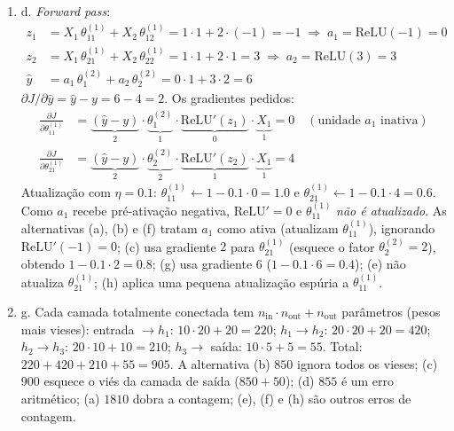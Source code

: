 \documentclass{dlproblemset}
\begin{document}
\begin{enumerate}[1)]
    \item d. \textit{Forward pass}:
    \begin{align*}
        z_1 &= X_1\,\theta^{(1)}_{11} + X_2\,\theta^{(1)}_{12} = 1\cdot 1 + 2\cdot(-1) = -1 \;\Rightarrow\; a_1 = \mathrm{ReLU}(-1) = 0 \\
        z_2 &= X_1\,\theta^{(1)}_{21} + X_2\,\theta^{(1)}_{22} = 1\cdot 1 + 2\cdot 1 = 3 \;\Rightarrow\; a_2 = \mathrm{ReLU}(3) = 3 \\
        \hat{y} &= a_1\,\theta^{(2)}_{1} + a_2\,\theta^{(2)}_{2} = 0\cdot 1 + 3\cdot 2 = 6
    \end{align*}
    $\partial J/\partial \hat{y} = \hat{y} - y = 6 - 4 = 2$. Os gradientes pedidos:
    \begin{align*}
        \frac{\partial J}{\partial \theta^{(1)}_{11}} &= \underbrace{(\hat{y}-y)}_{2}\cdot \underbrace{\theta^{(2)}_{1}}_{1}\cdot \underbrace{\mathrm{ReLU}'(z_1)}_{0}\cdot \underbrace{X_1}_{1} = 0 \quad (\text{unidade } a_1 \text{ inativa}) \\
        \frac{\partial J}{\partial \theta^{(1)}_{21}} &= \underbrace{(\hat{y}-y)}_{2}\cdot \underbrace{\theta^{(2)}_{2}}_{2}\cdot \underbrace{\mathrm{ReLU}'(z_2)}_{1}\cdot \underbrace{X_1}_{1} = 4
    \end{align*}
    Atualização com $\eta = 0.1$: $\theta^{(1)}_{11} \leftarrow 1 - 0.1\cdot 0 = 1.0$ e $\theta^{(1)}_{21} \leftarrow 1 - 0.1\cdot 4 = 0.6$. Como $a_1$ recebe pré-ativação negativa, $\mathrm{ReLU}' = 0$ e $\theta^{(1)}_{11}$ \emph{não é atualizado}. As alternativas (a), (b) e (f) tratam $a_1$ como ativa (atualizam $\theta^{(1)}_{11}$), ignorando $\mathrm{ReLU}'(-1) = 0$; (c) usa gradiente $2$ para $\theta^{(1)}_{21}$ (esquece o fator $\theta^{(2)}_2 = 2$), obtendo $1 - 0.1\cdot 2 = 0.8$; (g) usa gradiente $6$ ($1 - 0.1\cdot 6 = 0.4$); (e) não atualiza $\theta^{(1)}_{21}$; (h) aplica uma pequena atualização espúria a $\theta^{(1)}_{11}$.

    \item g. Cada camada totalmente conectada tem $n_{\text{in}}\cdot n_{\text{out}} + n_{\text{out}}$ parâmetros (pesos mais vieses): entrada $\to h_1$: $10\cdot 20 + 20 = 220$; $h_1 \to h_2$: $20\cdot 20 + 20 = 420$; $h_2 \to h_3$: $20\cdot 10 + 10 = 210$; $h_3 \to$ saída: $10\cdot 5 + 5 = 55$. Total: $220 + 420 + 210 + 55 = 905$. A alternativa (b) $850$ ignora todos os vieses; (c) $900$ esquece o viés da camada de saída ($850 + 50$); (d) $855$ é um erro aritmético; (a) $1810$ dobra a contagem; (e), (f) e (h) são outros erros de contagem.


\end{enumerate}
\end{document}
